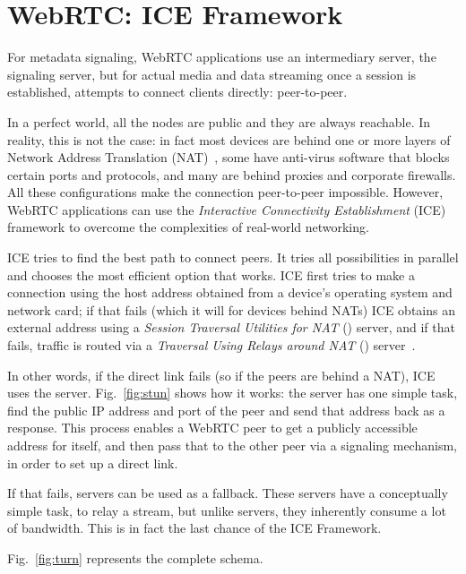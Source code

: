 \section{WebRTC: ICE Framework}
\label{sec:webrtc_ice}
For metadata signaling, WebRTC applications use an intermediary server, the signaling server, but for actual media and data streaming once a session is established, \RTCPeerConnection attempts to connect clients directly: peer-to-peer. 

In a perfect world, all the nodes are public and they are always reachable. In reality, this is not the case: in fact most devices are behind one or more layers of Network Address Translation (NAT)~\cite{nat}, some have anti-virus software that blocks certain ports and protocols, and many are behind proxies and corporate firewalls. All these configurations make the connection peer-to-peer impossible. However, WebRTC applications can use the \textit{Interactive Connectivity Establishment} (ICE) framework to overcome the complexities of real-world networking. 

ICE tries to find the best path to connect peers. It tries all possibilities in parallel and chooses the most efficient option that works. ICE first tries to make a connection using the host address obtained from a device's operating system and network card; if that fails (which it will for devices behind NATs) ICE obtains an external address using a \textit{Session Traversal Utilities for NAT} (\STUN) server, and if that fails, traffic is routed via a \textit{Traversal Using Relays around NAT} (\TURN) server~\cite{webrtc_infrastructure}. 

In other words, if the direct link fails (so if the peers are behind a NAT), ICE uses the \STUN server. Fig.~\ref{fig:stun} shows how it works: the server has one simple task, find the public IP address and port of the peer and send that address back as a response.  This process enables a WebRTC peer to get a publicly accessible address for itself, and then pass that to the other peer via a signaling mechanism, in order to set up a direct link.

If that fails, \TURN servers can be used as a fallback. These servers have a conceptually simple task, to relay a stream, but unlike \STUN servers, they inherently consume a lot of bandwidth. This is in fact the last chance of the ICE Framework.

Fig.~\ref{fig:turn} represents the complete schema.

